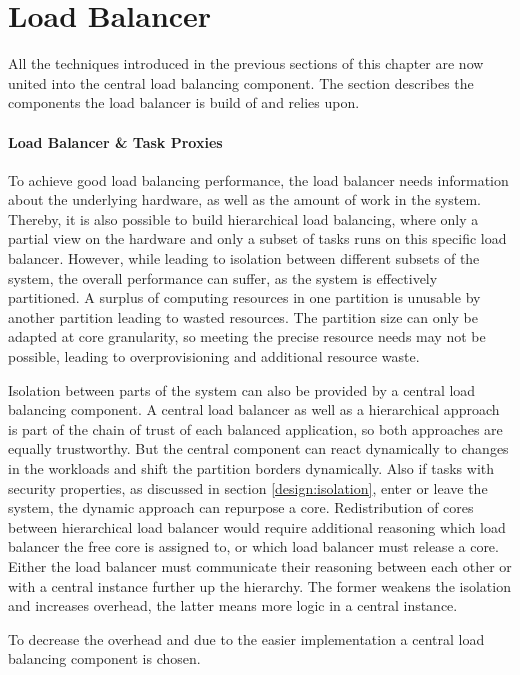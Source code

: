 \section{Load Balancer}
\label{design:balancer}

All the techniques introduced in the previous sections of this chapter
are now united into the central load balancing component.
The section describes the components the load balancer is build of and relies
upon.


\paragraph{Load Balancer \& Task Proxies}
To achieve good load balancing performance, the load balancer needs information
about the underlying hardware, as well as the amount of work in the system.
Thereby, it is also possible to build hierarchical load balancing, where
only a partial view on the hardware and only a subset of tasks runs on this
specific load balancer.
However, while leading to isolation between different subsets of the system,
the overall performance can suffer, as the system is effectively partitioned.
A surplus of computing resources in one partition is unusable by another
partition leading to wasted resources.
The partition size can only be adapted at core granularity, so meeting the
precise resource needs may not be possible, leading to overprovisioning and
additional resource waste.

Isolation between parts of the system can also be provided by a central load
balancing component.
A central load balancer as well as a hierarchical approach is part of the chain
of trust of each balanced application, so both approaches are equally
trustworthy.
But the central component can react dynamically to changes in the workloads and
shift the partition borders dynamically.
Also if tasks with security properties, as discussed in section
\ref{design:isolation}, enter or leave the system, the dynamic approach can
repurpose a core.
Redistribution of cores between hierarchical load balancer would require
additional reasoning which load balancer the free core is assigned to, or which
load balancer must release a core.
Either the load balancer must communicate their reasoning between each other or
with a central instance further up the hierarchy.
The former weakens the isolation and increases overhead, the latter means more
logic in a central instance.

To decrease the overhead and due to the easier implementation a central load
balancing component is chosen.

